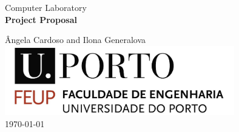 

\begin{titlepage}
\begin{center}
 
\vspace*{3cm}

{\Large Computer Laboratory}\\[2cm]

{\Huge \bfseries Project Proposal \\[1cm]}

{\large \^Angela Cardoso and Ilona Generalova}\\[2cm]

\includegraphics[width=10cm]{feup_logo.jpg}\\[2cm]


{\large \today}

\end{center}
\end{titlepage}